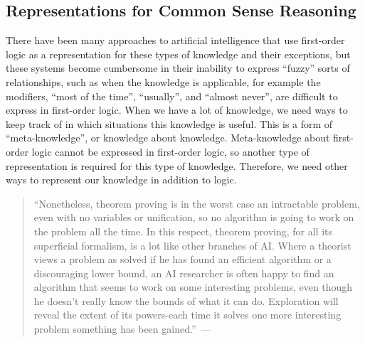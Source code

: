 

\subsection{Representations for Common Sense Reasoning}

There have been many approaches to artificial intelligence that use
first-order logic as a representation for these types of knowledge and
their exceptions, but these systems become cumbersome in their
inability to express ``fuzzy'' sorts of relationships, such as when
the knowledge is applicable, for example the modifiers, ``most of the
time'', ``usually'', and ``almost never'', are difficult to express in
first-order logic.  When we have a lot of knowledge, we need ways to
keep track of in which situations this knowledge is useful.  This is a
form of ``meta-knowledge'', or knowledge about knowledge.
Meta-knowledge about first-order logic cannot be expressed in
first-order logic, so another type of representation is required for
this type of knowledge.  Therefore, we need other ways to represent
our knowledge in addition to logic.

\begin{quote}
``Nonetheless, theorem proving is in the worst case an intractable
  problem, even with no variables or unification, so no algorithm is
  going to work on the problem all the time. In this respect, theorem
  proving, for all its superficial formalism, is a lot like other
  branches of AI.  Where a theorist views a problem as solved if he
  has found an efficient algorithm or a discouraging lower bound, an
  AI researcher is often happy to find an algorithm that seems to work
  on some interesting problems, even though he doesn't really know the
  bounds of what it can do. Exploration will reveal the extent of its
  powers-each time it solves one more interesting problem something
  has been
  gained.''~---~
\end{quote}


